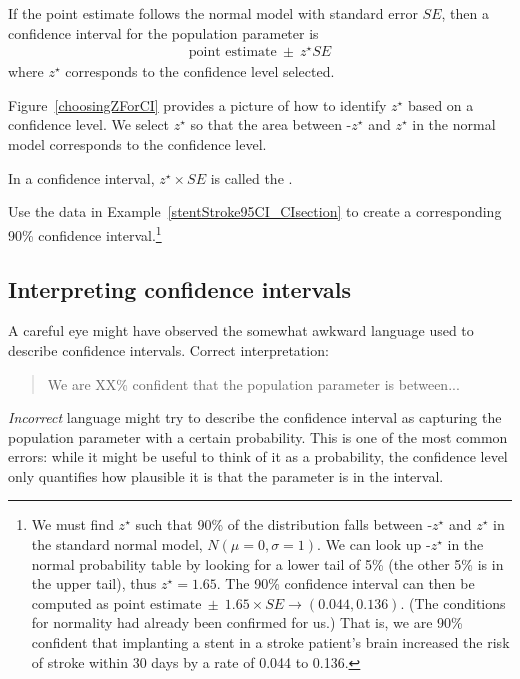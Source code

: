 \begin{termBox}{
If the point estimate follows the normal model with standard error $SE$, then a confidence interval for the population parameter is
\begin{eqnarray*}
\text{point estimate}\ \pm\ z^{\star} SE
\end{eqnarray*}
where $z^{\star}$ corresponds to the confidence level selected.}
\end{termBox}

Figure~\ref{choosingZForCI} provides a picture of how to identify $z^{\star}$ based on a confidence level. We select $z^{\star}$ so that the area between -$z^{\star}$ and $z^{\star}$ in the normal model corresponds to the confidence level. 

\begin{termBox}{
\label{marginOfErrorTermBox}In a confidence interval, $z^{\star}\times SE$ is called the .}
\end{termBox}

\begin{exercise} \label{find90CIForRun10AgeExercise}
Use the data in Example~\ref{stentStroke95CI_CIsection} to create a corresponding 90\% confidence interval.\footnote{We must find $z^{\star}$ such that 90\% of the distribution falls between -$z^{\star}$ and $z^{\star}$ in the standard normal model, $N(\mu=0, \sigma=1)$. We can look up -$z^{\star}$ in the normal probability table by looking for a lower tail of 5\% (the other 5\% is in the upper tail), thus $z^{\star}=1.65$. The 90\% confidence interval can then be computed as $\text{point estimate}\ \pm\ 1.65\times SE \to (0.044, 0.136)$. (The conditions for normality had already been confirmed for us.) That is, we are 90\% confident that implanting a stent in a stroke patient's brain increased the risk of stroke within 30 days by a rate of 0.044 to 0.136.}
\end{exercise}

\subsection{Interpreting confidence intervals}
\label{interpretingCIs}



A careful eye might have observed the somewhat awkward language used to describe confidence intervals. Correct interpretation:
\begin{quote}
We are XX\% confident that the population parameter is between...
\end{quote}
\emph{Incorrect} language might try to describe the confidence interval as capturing the population parameter with a certain probability. This is one of the most common errors: while it might be useful to think of it as a probability, the confidence level only quantifies how plausible it is that the parameter is in the interval.

